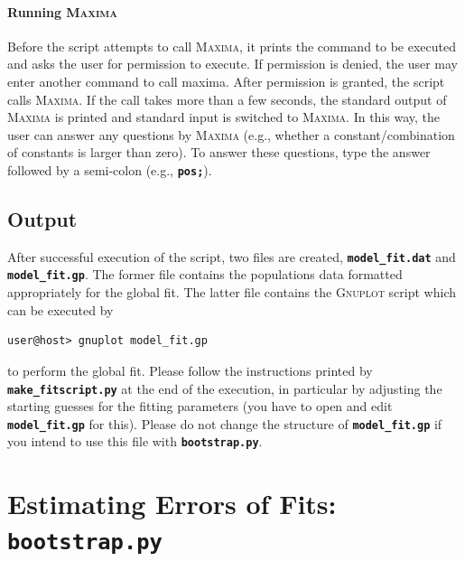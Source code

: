 \documentclass[a4paper,10pt,DIV=15,openany]{scrbook}
\newcommand{\ttt}[1]{\textbf{\texttt{#1}}}
\begin{document}
\paragraph{Running \textsc{Maxima}}

Before the script attempts to call \textsc{Maxima}, it prints the command to be executed and asks the user for permission to execute.
If permission is denied, the user may enter another command to call maxima.
After permission is granted, the script calls \textsc{Maxima}.
If the call takes more than a few seconds, the standard output of \textsc{Maxima} is printed and standard input is switched to \textsc{Maxima}.
In this way, the user can answer any questions by \textsc{Maxima} (e.g., whether a constant/combination of constants is larger than zero).
To answer these questions, type the answer followed by a semi-colon (e.g., \ttt{pos;}).

\subsection{Output}

After successful execution of the script, two files are created, \ttt{model\_fit.dat} and \ttt{model\_fit.gp}.
The former file contains the populations data formatted appropriately for the global fit.
The latter file contains the \textsc{Gnuplot} script which can be executed by
\begin{verbatim}
user@host> gnuplot model_fit.gp
\end{verbatim}
to perform the global fit.
Please follow the instructions printed by \ttt{make\_fitscript.py} at the end of the execution, in particular by adjusting the starting guesses for the fitting parameters (you have to open and edit \ttt{model\_fit.gp} for this).
Please do not change the structure of \ttt{model\_fit.gp} if you intend to use this file with \ttt{bootstrap.py}.



\section{Estimating Errors of Fits: \ttt{bootstrap.py}}\label{sec:bootstrap.py}
\end{document}
